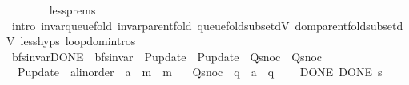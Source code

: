 \begin{isabellebody}
\ \ \ \ \ \ \isamarkupfalse%
\ less{\isachardot}{\kern0pt}prems\isanewline
\ \ \ \ \ \ \isamarkupfalse%
\ {\isacharparenleft}{\kern0pt}intro\ invar{\isacharunderscore}{\kern0pt}queue{\isacharunderscore}{\kern0pt}fold{\isacharunderscore}{\kern0pt}{}\ invar{\isacharunderscore}{\kern0pt}parent{\isacharunderscore}{\kern0pt}fold{\isacharunderscore}{\kern0pt}{}\ queue{\isacharunderscore}{\kern0pt}fold{\isacharunderscore}{\kern0pt}subset{\isacharunderscore}{\kern0pt}dV\ dom{\isacharunderscore}{\kern0pt}parent{\isacharunderscore}{\kern0pt}fold{\isacharunderscore}{\kern0pt}subset{\isacharunderscore}{\kern0pt}dV{\isacharunderscore}{\kern0pt}{}\ less{\isachardot}{\kern0pt}hyps\ loop{\isachardot}{\kern0pt}domintros{\isacharparenright}{\kern0pt}\isanewline
\ \ \isamarkupfalse%
\isanewline
{}\isamarkupfalse%
%
\endisatagproof
{\isafoldproof}%
%
\isadelimproof
%
\endisadelimproof
%
\isadelimdocument
%
\endisadelimdocument
%
\isatagdocument
%
\isamarkuptrue%
%
\isamarkuptrue%
%
\endisatagdocument
{\isafolddocument}%
%
\isadelimdocument
%
\endisadelimdocument
{}\isamarkupfalse%
\ bfs{\isacharunderscore}{\kern0pt}invar{\isacharunderscore}{\kern0pt}DONE\ {\isacharequal}{\kern0pt}\ bfs{\isacharunderscore}{\kern0pt}invar\ \ P{\isacharunderscore}{\kern0pt}update\ {\isacharequal}{\kern0pt}\ P{\isacharunderscore}{\kern0pt}update\ \ Q{\isacharunderscore}{\kern0pt}snoc\ {\isacharequal}{\kern0pt}\ Q{\isacharunderscore}{\kern0pt}snoc\ \isanewline
\ \ P{\isacharunderscore}{\kern0pt}update\ {\isacharcolon}{\kern0pt}{\isacharcolon}{\kern0pt}\ {\isachardoublequoteopen}{\isacharprime}{\kern0pt}a{\isacharcolon}{\kern0pt}{\isacharcolon}{\kern0pt}linorder\ {\isasymRightarrow}\ {\isacharprime}{\kern0pt}a\ {\isasymRightarrow}\ {\isacharprime}{\kern0pt}m\ {\isasymRightarrow}\ {\isacharprime}{\kern0pt}m{\isachardoublequoteclose}\ \isanewline
\ \ Q{\isacharunderscore}{\kern0pt}snoc\ {\isacharcolon}{\kern0pt}{\isacharcolon}{\kern0pt}\ {\isachardoublequoteopen}{\isacharprime}{\kern0pt}q\ {\isasymRightarrow}\ {\isacharprime}{\kern0pt}a\ {\isasymRightarrow}\ {\isacharprime}{\kern0pt}q{\isachardoublequoteclose}\ {\isacharplus}{\kern0pt}\isanewline
\ \ \ DONE{\isacharcolon}{\kern0pt}\ {\isachardoublequoteopen}DONE\ s{\isachardoublequoteclose}\isanewline
\isanewline
\isanewline
\isanewline
\isanewline
\isanewline
\isanewline
\isanewline

\end{isabellebody}
